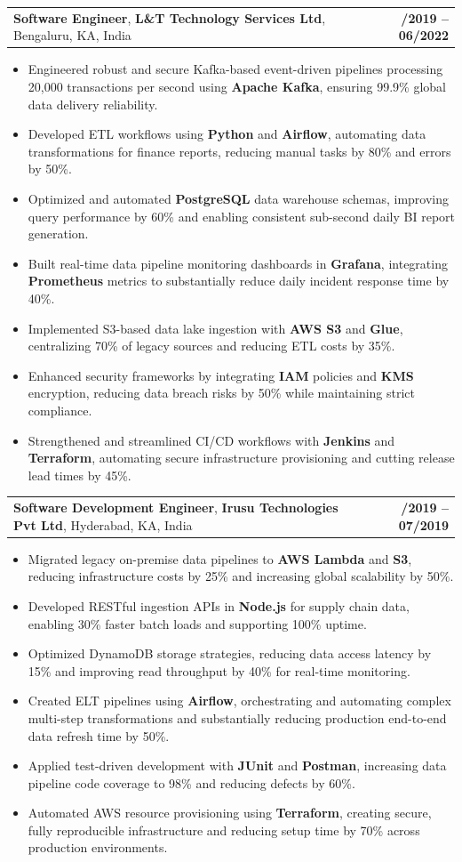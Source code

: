 \documentclass[letterpaper,11pt]{article}
\makeatletter
\newcommand{\resumeItem}[1]{
  \item\footnotesize{
    {#1 \vspace{-2pt}}
  }
}
\newcommand{\resumeSubheading}[4]{
  \vspace{-2pt}\item
    \begin{tabular*}{1.0\textwidth}[t]{l@{\extracolsep{\fill}}r}
      \textbf{\fontsize{10pt}{14pt}\selectfont #3}, \textbf{\fontsize{10pt}{14pt}\selectfont #1}, \fontsize{10pt}{14pt}\selectfont #4 & \textbf{\fontsize{10pt}{14pt}\selectfont #2} \\
    \end{tabular*}\vspace{-7pt}
}
\newcommand{\resumeItemListStart}{\begin{itemize}[leftmargin=*]}
\newcommand{\resumeItemListEnd}{\end{itemize}\vspace{-5pt}}
\makeatother
\begin{document}
    \resumeSubheading
        {L\&T Technology Services Ltd}{08/2019 -- 06/2022}
        {Software Engineer}{Bengaluru, KA, India}
      \resumeItemListStart
        \resumeItem{Engineered robust and secure Kafka-based event-driven pipelines processing 20,000 transactions per second using \textbf{Apache Kafka}, ensuring 99.9\% global data delivery reliability.}
        \resumeItem{Developed ETL workflows using \textbf{Python} and \textbf{Airflow}, automating data transformations for finance reports, reducing manual tasks by 80\% and errors by 50\%.}
        \resumeItem{Optimized and automated \textbf{PostgreSQL} data warehouse schemas, improving query performance by 60\% and enabling consistent sub-second daily BI report generation.}
        \resumeItem{Built real-time data pipeline monitoring dashboards in \textbf{Grafana}, integrating \textbf{Prometheus} metrics to substantially reduce daily incident response time by 40\%.}
        \resumeItem{Implemented S3-based data lake ingestion with \textbf{AWS S3} and \textbf{Glue}, centralizing 70\% of legacy sources and reducing ETL costs by 35\%.}
        \resumeItem{Enhanced security frameworks by integrating \textbf{IAM} policies and \textbf{KMS} encryption, reducing data breach risks by 50\% while maintaining strict compliance.}
        \resumeItem{Strengthened and streamlined CI/CD workflows with \textbf{Jenkins} and \textbf{Terraform}, automating secure infrastructure provisioning and cutting release lead times by 45\%.}
      \resumeItemListEnd

    \resumeSubheading
        {Irusu Technologies Pvt Ltd}{01/2019 -- 07/2019}
        {Software Development Engineer}{Hyderabad, KA, India}
      \resumeItemListStart
        \resumeItem{Migrated legacy on-premise data pipelines to \textbf{AWS Lambda} and \textbf{S3}, reducing infrastructure costs by 25\% and increasing global scalability by 50\%.}
        \resumeItem{Developed RESTful ingestion APIs in \textbf{Node.js} for supply chain data, enabling 30\% faster batch loads and supporting 100\% uptime.}
        \resumeItem{Optimized DynamoDB storage strategies, reducing data access latency by 15\% and improving read throughput by 40\% for real-time monitoring.}
        \resumeItem{Created ELT pipelines using \textbf{Airflow}, orchestrating and automating complex multi-step transformations and substantially reducing production end-to-end data refresh time by 50\%.}
        \resumeItem{Applied test-driven development with \textbf{JUnit} and \textbf{Postman}, increasing data pipeline code coverage to 98\% and reducing defects by 60\%.}
        \resumeItem{Automated AWS resource provisioning using \textbf{Terraform}, creating secure, fully reproducible infrastructure and reducing setup time by 70\% across production environments.}
      \resumeItemListEnd
\end{document}
